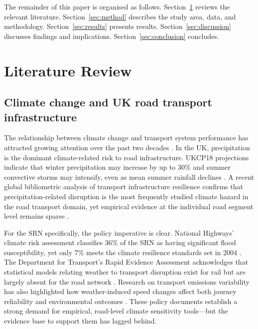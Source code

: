 \documentclass[review]{elsarticle}
\begin{document}
The remainder of this paper is organised as follows. Section~\ref{sec:lit} reviews the relevant literature. Section~\ref{sec:method} describes the study area, data, and methodology. Section~\ref{sec:results} presents results. Section~\ref{sec:discussion} discusses findings and implications. Section~\ref{sec:conclusion} concludes.


\section{Literature Review}
\label{sec:lit}

\subsection{Climate change and UK road transport infrastructure}
\label{sec:lit:climate}

The relationship between climate change and transport system performance has attracted growing attention over the past two decades \citep{koetse2009impact,jaroszweski2010effect,stern2007contribution}. In the UK, precipitation is the dominant climate-related risk to road infrastructure. UKCP18 projections indicate that winter precipitation may increase by up to 30\% and summer convective storms may intensify, even as mean summer rainfall declines \citep{ukcp18}. A recent global bibliometric analysis of transport infrastructure resilience confirms that precipitation-related disruption is the most frequently studied climate hazard in the road transport domain, yet empirical evidence at the individual road segment level remains sparse \citep{zhou2026bibliometric}.

For the SRN specifically, the policy imperative is clear. National Highways' climate risk assessment classifies 36\% of the SRN as having significant flood susceptibility, yet only 7\% meets the climate resilience standards set in 2004 \citep{nce2026srn,nh2024climate}. The Department for Transport's Rapid Evidence Assessment acknowledges that statistical models relating weather to transport disruption exist for rail but are largely absent for the road network \citep{dft2024rea}. Research on transport emissions variability has also highlighted how weather-induced speed changes affect both journey reliability and environmental outcomes \citep{wan2025variability}. These policy documents establish a strong demand for empirical, road-level climate sensitivity tools---but the evidence base to support them has lagged behind.
\end{document}
